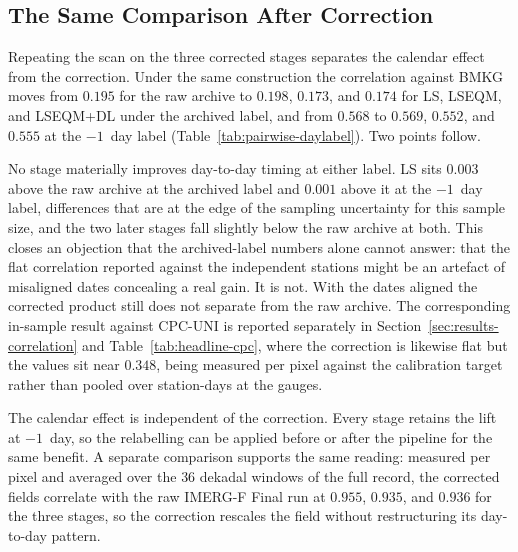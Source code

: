 \subsection{The Same Comparison After Correction}

Repeating the scan on the three corrected stages separates the
calendar effect from the correction. Under the same construction
the correlation against BMKG moves from $0.195$ for the raw archive
to $0.198$, $0.173$, and $0.174$ for LS, LSEQM, and LSEQM+DL under
the archived label, and from $0.568$ to $0.569$, $0.552$, and
$0.555$ at the $-1$~day label (Table~\ref{tab:pairwise-daylabel}).
Two points follow.

No stage materially improves day-to-day timing at either label. LS
sits $0.003$ above the raw archive at the archived label and $0.001$
above it at the $-1$~day label, differences that are at the edge of
the sampling uncertainty for this sample size, and the two later
stages fall slightly below the raw archive at both. This closes an
objection that the archived-label numbers alone cannot answer: that
the flat correlation reported against the independent stations
might be an artefact of misaligned dates concealing a real gain. It
is not. With the dates aligned the corrected product still does not
separate from the raw archive. The corresponding in-sample result
against CPC-UNI is reported separately in
Section~\ref{sec:results-correlation} and
Table~\ref{tab:headline-cpc}, where the correction is likewise flat
but the values sit near $0.348$, being measured per pixel against the
calibration target rather than pooled over station-days at the gauges.

The calendar effect is independent of the correction. Every stage
retains the lift at $-1$~day, so the relabelling can be applied
before or after the pipeline for the same benefit. A separate
comparison supports the same reading: measured per pixel and
averaged over the $36$ dekadal windows of the full record, the
corrected fields correlate with the raw IMERG-F Final run at
$0.955$, $0.935$, and $0.936$ for the three stages, so the
correction rescales the field without restructuring its day-to-day
pattern.

